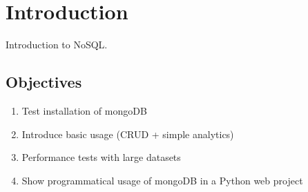 \newpage

\listoftables
{}
\newpage


\listoffigures
{}
\newpage

\listoflistings
{}
\newpage

\renewcommand{\thepage}{\arabic{page}}

\setcounter{page}{1} 


\section{Introduction}
\label{sec:introduction}

Introduction to NoSQL.



\subsection{Objectives}
\label{sec:objectives}

\begin{enumerate}
  \item Test installation of mongoDB
  \item Introduce basic usage (CRUD + simple analytics)
  \item Performance tests with large datasets
  \item Show programmatical usage of mongoDB in a Python web project
\end{enumerate}

